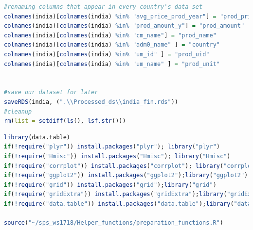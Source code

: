 \documentclass[11pt]{article}
\begin{document}
\begin{lstlisting}[language= R]
#renaming columns that appear in every country's data set
colnames(india)[colnames(india) %in% "avg_price_prod_year"] = "prod_price"
colnames(india)[colnames(india) %in% "prod_amount_y"] = "prod_amount"
colnames(india)[colnames(india) %in% "cm_name"] = "prod_name"
colnames(india)[colnames(india) %in% "adm0_name" ] = "country"
colnames(india)[colnames(india) %in% "um_id" ] = "prod_uid"
colnames(india)[colnames(india) %in% "um_name" ] = "prod_unit"


#save our dataset for later
saveRDS(india, (".\\Processed_ds\\india_fin.rds"))
#cleanup
rm(list = setdiff(ls(), lsf.str()))

\end{lstlisting}


\begin{lstlisting}[language= R]
library(data.table)
if(!require("plyr")) install.packages("plyr"); library("plyr")
if(!require("Hmisc")) install.packages("Hmisc"); library("Hmisc")
if(!require("corrplot")) install.packages("corrplot"); library("corrplot")
if(!require("ggplot2")) install.packages("ggplot2");library("ggplot2")
if(!require("grid")) install.packages("grid");library("grid")
if(!require("gridExtra")) install.packages("gridExtra");library("gridExtra")
if(!require("data.table")) install.packages("data.table");library("data.table")

source("~/sps_ws1718/Helper_functions/preparation_functions.R")




\end{lstlisting}
\end{document}
